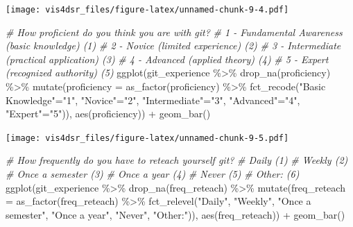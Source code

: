 \documentclass[
]{krantz}
\makeatletter
\newenvironment{Shaded}{\begin{snugshade}}{\end{snugshade}}
\newcommand{\AttributeTok}[1]{\textcolor[rgb]{0.61,0.61,0.61}{#1}}
\newcommand{\CommentTok}[1]{\textcolor[rgb]{0.37,0.37,0.37}{\textit{#1}}}
\newcommand{\FunctionTok}[1]{\textcolor[rgb]{0,0,0}{#1}}
\newcommand{\NormalTok}[1]{#1}
\newcommand{\OtherTok}[1]{\textcolor[rgb]{0.37,0.37,0.37}{#1}}
\newcommand{\SpecialCharTok}[1]{\textcolor[rgb]{0,0,0}{#1}}
\newcommand{\StringTok}[1]{\textcolor[rgb]{0.5,0.5,0.5}{#1}}
\newenvironment{kframe}{%
\medskip{}
\setlength{\fboxsep}{.8em}
 \def\at@end@of@kframe{}%
 \ifinner\ifhmode%
  \def\at@end@of@kframe{\end{minipage}}%
  \begin{minipage}{\columnwidth}%
 \fi\fi%
 \def\FrameCommand##1{\hskip\@totalleftmargin \hskip-\fboxsep
 \colorbox{shadecolor}{##1}\hskip-\fboxsep
     \hskip-\linewidth \hskip-\@totalleftmargin \hskip\columnwidth}%
 \MakeFramed {\advance\hsize-\width
   \@totalleftmargin\z@ \linewidth\hsize
   \@setminipage}}%
 {\par\unskip\endMakeFramed%
 \at@end@of@kframe}
\renewenvironment{Shaded}{\begin{kframe}}{\end{kframe}}
\makeatother
\begin{document}
\texttt{[image: vis4dsr\_files/figure-latex/unnamed-chunk-9-4.pdf]}

\begin{Shaded}
\begin{Highlighting}[]
\CommentTok{\# How proficient do you think you are with git?}
\CommentTok{\# 1 {-} Fundamental Awareness (basic knowledge) (1)}
\CommentTok{\# 2 {-} Novice (limited experience) (2)}
\CommentTok{\# 3 {-} Intermediate (practical application) (3)}
\CommentTok{\# 4 {-} Advanced (applied theory) (4)}
\CommentTok{\# 5 {-} Expert (recognized authority) (5)}
\FunctionTok{ggplot}\NormalTok{(git\_experience }\SpecialCharTok{\%\textgreater{}\%} 
         \FunctionTok{drop\_na}\NormalTok{(proficiency) }\SpecialCharTok{\%\textgreater{}\%}
         \FunctionTok{mutate}\NormalTok{(}\AttributeTok{proficiency =} \FunctionTok{as\_factor}\NormalTok{(proficiency) }\SpecialCharTok{\%\textgreater{}\%} 
             \FunctionTok{fct\_recode}\NormalTok{(}\StringTok{"Basic Knowledge"}\OtherTok{=}\StringTok{"1"}\NormalTok{, }
                        \StringTok{"Novice"}\OtherTok{=}\StringTok{"2"}\NormalTok{, }\StringTok{"Intermediate"}\OtherTok{=}\StringTok{"3"}\NormalTok{, }
                        \StringTok{"Advanced"}\OtherTok{=}\StringTok{"4"}\NormalTok{, }\StringTok{"Expert"}\OtherTok{=}\StringTok{"5"}\NormalTok{)), }
       \FunctionTok{aes}\NormalTok{(proficiency)) }\SpecialCharTok{+}
  \FunctionTok{geom\_bar}\NormalTok{()}
\end{Highlighting}
\end{Shaded}

\texttt{[image: vis4dsr\_files/figure-latex/unnamed-chunk-9-5.pdf]}

\begin{Shaded}
\begin{Highlighting}[]
\CommentTok{\# How frequently do you have to reteach yourself git?}
\CommentTok{\# Daily (1)}
\CommentTok{\# Weekly (2)}
\CommentTok{\# Once a semester (3)}
\CommentTok{\# Once a year (4)}
\CommentTok{\# Never (5)}
\CommentTok{\# Other: (6)}
\FunctionTok{ggplot}\NormalTok{(git\_experience }\SpecialCharTok{\%\textgreater{}\%}
         \FunctionTok{drop\_na}\NormalTok{(freq\_reteach) }\SpecialCharTok{\%\textgreater{}\%}
         \FunctionTok{mutate}\NormalTok{(}\AttributeTok{freq\_reteach =} \FunctionTok{as\_factor}\NormalTok{(freq\_reteach) }\SpecialCharTok{\%\textgreater{}\%} 
             \FunctionTok{fct\_relevel}\NormalTok{(}\StringTok{"Daily"}\NormalTok{, }\StringTok{"Weekly"}\NormalTok{, }\StringTok{"Once a semester"}\NormalTok{,}
                         \StringTok{"Once a year"}\NormalTok{, }\StringTok{"Never"}\NormalTok{, }\StringTok{"Other:"}\NormalTok{)), }
       \FunctionTok{aes}\NormalTok{(freq\_reteach)) }\SpecialCharTok{+}
  \FunctionTok{geom\_bar}\NormalTok{()}
\end{Highlighting}
\end{Shaded}
\end{document}
